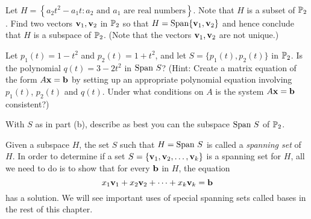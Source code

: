 \begin{activity} \label{act:5_a_4} ~
	\ba
	\item Let $H = \left\{ a_2t^2-a_1t : a_2 \text{ and } a_1 \text{ are real numbers}\right\}$. Note that $H$ is a subset of $\mathbb{P}_2$. Find two vectors $\mathbf{v}_1, \mathbf{v}_2$ in $\mathbb{P}_2$ so that $H= \text{Span}\{\mathbf{v}_1, \mathbf{v}_2\}$ and hence conclude that $H$ is a subspace of $\mathbb{P}_2$. (Note that the vectors $\mathbf{v}_1, \mathbf{v}_2$ are not unique.)
	
	\item Let $p_1(t) = 1-t^2$ and $p_2(t) = 1+t^2$, and let $S = \{p_1(t), p_2(t)\}$ in $\mathbb{P}_2$. Is the polynomial $q(t) = 3-2t^2$ in $\text{Span} \ S$? (Hint: Create a matrix equation of the form $A \mathbf{x} = \mathbf{b}$ by setting up an appropriate polynomial equation involving $p_1(t)$, $p_2(t)$ and $q(t)$. Under what conditions on $A$ is the system $A \mathbf{x} = \mathbf{b}$ consistent?) 

	\item With $S$ as in part (b), describe as best you can the subspace $\text{Span} \ S$ of $\mathbb{P}_2$. 

	\ea
		
\end{activity}

Given a subspace $H$, the set $S$ such that $H=\text{Span} \ S$ is called a \emph{spanning set} of $H$. In order to determine if a set $S=\{\mathbf{v}_1, \mathbf{v}_2, \ldots, \mathbf{v}_k\}$ is a spanning set for $H$, all we need to do is to show that for every $\mathbf{b}$ in $H$, the equation
\[ x_1 \mathbf{v}_1 + x_2\mathbf{v}_2 + \cdots + x_k \mathbf{v}_k = \mathbf{b} \]
has a solution. We will see important uses of special spanning sets called bases in the rest of this chapter. 

\label{sec:vec_space_exam}

\ExampleIntro

